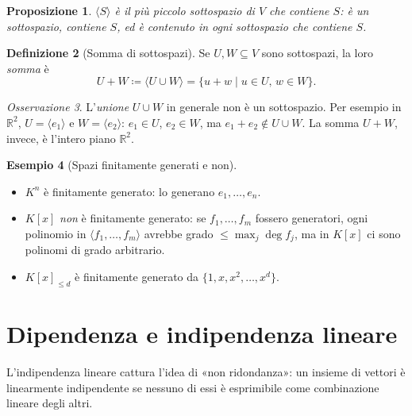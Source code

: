 \documentclass[11pt, a4paper]{book}
\theoremstyle{definition}
\newtheorem{definizione}{Definizione}[section]
\newtheorem{esempio}[definizione]{Esempio}
\theoremstyle{plain}
\newtheorem{proposizione}[definizione]{Proposizione}
\theoremstyle{remark}
\newtheorem{osservazione}[definizione]{Osservazione}
\newcommand{\R}{\mathbb{R}}
\begin{document}
\begin{proposizione}
$\langle S \rangle$ è il più piccolo sottospazio di $V$ che contiene $S$: è un sottospazio, contiene $S$, ed è contenuto in ogni sottospazio che contiene $S$.
\end{proposizione}

\begin{defbox}
\begin{definizione}[Somma di sottospazi]
Se $U, W \subseteq V$ sono sottospazi, la loro \emph{somma} è
\[
  U + W \coloneqq \langle U \cup W \rangle = \{u + w \mid u \in U,\, w \in W\}.
\]
\end{definizione}
\end{defbox}

\begin{osservazione}
L'\emph{unione} $U \cup W$ in generale non è un sottospazio. Per esempio in $\R^2$, $U = \langle e_1 \rangle$ e $W = \langle e_2 \rangle$: $e_1 \in U$, $e_2 \in W$, ma $e_1 + e_2 \notin U \cup W$. La somma $U + W$, invece, è l'intero piano $\R^2$.
\end{osservazione}

\begin{exbox}
\begin{esempio}[Spazi finitamente generati e non]
\begin{itemize}
  \item $K^n$ è finitamente generato: lo generano $e_1, \ldots, e_n$.
  \item $K[x]$ \emph{non} è finitamente generato: se $f_1, \ldots, f_m$ fossero generatori, ogni polinomio in $\langle f_1, \ldots, f_m \rangle$ avrebbe grado $\leq \max_j \deg f_j$, ma in $K[x]$ ci sono polinomi di grado arbitrario.
  \item $K[x]_{\leq d}$ è finitamente generato da $\{1, x, x^2, \ldots, x^d\}$.
\end{itemize}
\end{esempio}
\end{exbox}

\section{Dipendenza e indipendenza lineare}

L'indipendenza lineare cattura l'idea di «non ridondanza»: un insieme di vettori è linearmente indipendente se nessuno di essi è esprimibile come combinazione lineare degli altri.
\end{document}
